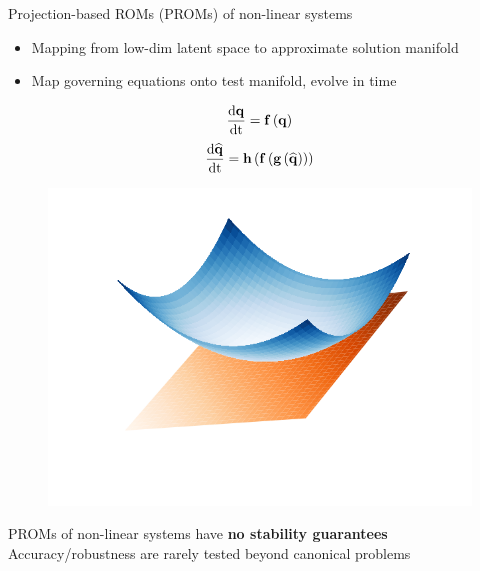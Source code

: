 \documentclass[]{beamer}
\begin{document}
\begin{frame}{Projection-based ROMs (PROMs) of non-linear systems}
    \begin{itemize}
        \item Mapping from low-dim latent space to approximate solution manifold
        \item Map governing equations onto test manifold, evolve in time
    \end{itemize}
	\centering
	\begin{minipage}{0.49\linewidth}
		\centering
		\vspace{-2em}
		\begin{equation*}
			\frac{\text{d} \mathbf{q}}{\text{d} \text{t}} = \mathbf{f} \left(\mathbf{q}\right)
		\end{equation*}
		\begin{equation*}
			\frac{\text{d} \mathbf{\widehat{q}}}{\text{d} \text{t}} = \mathbf{h}\left(\mathbf{f} \left(\mathbf{g}\left(\mathbf{\widehat{q}}\right)\right)\right)
		\end{equation*}
	\end{minipage}
	\hspace{-2em}
	\begin{minipage}{0.49\linewidth}
		\begin{figure}
			\includegraphics[width=0.99\linewidth,trim={2em 2em 2em 2em},clip]{theory/tangentPlane.png}
		\end{figure}
	\end{minipage}
	\begin{tcolorbox}[colframe=blue!50!white,halign=center]
		PROMs of non-linear systems have \textbf{no stability guarantees} \\
		Accuracy/robustness are rarely tested beyond canonical problems
	\end{tcolorbox}
\end{frame}
\end{document}
